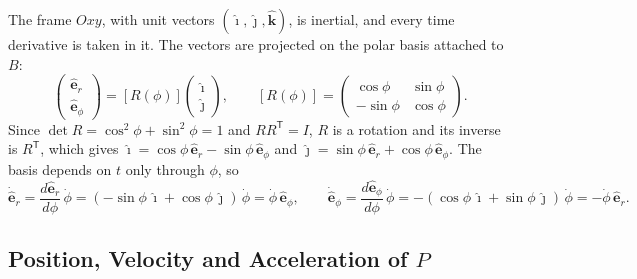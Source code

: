 \documentclass[11pt,a4paper]{article}
\numberwithin{equation}{section}
\newcommand{\er}{\hat{\mathbf{e}}_r}
\newcommand{\ephi}{\hat{\mathbf{e}}_\phi}
\newcommand{\ii}{\hat{\boldsymbol{\imath}}}
\newcommand{\jj}{\hat{\boldsymbol{\jmath}}}
\newcommand{\kk}{\hat{\mathbf{k}}}
\begin{document}
The frame $Oxy$, with unit vectors $(\ii,\jj,\kk)$, is inertial, and every time derivative is taken in it. The vectors are projected on the polar basis attached to $B$:
\begin{equation}
  \begin{pmatrix}\er\\ \ephi\end{pmatrix} = [R(\phi)]\begin{pmatrix}\ii\\ \jj\end{pmatrix},\qquad
  [R(\phi)] = \begin{pmatrix}\cos\phi & \sin\phi\\ -\sin\phi & \cos\phi\end{pmatrix}.
\end{equation}
Since $\det R=\cos^2\phi+\sin^2\phi=1$ and $RR^{\mathsf T}=I$, $R$ is a rotation and its inverse is $R^{\mathsf T}$, which gives $\ii=\cos\phi\,\er-\sin\phi\,\ephi$ and $\jj=\sin\phi\,\er+\cos\phi\,\ephi$. The basis depends on $t$ only through $\phi$, so
\begin{equation}
  \dot{\hat{\mathbf e}}_r = \frac{d\er}{d\phi}\,\dot\phi = (-\sin\phi\,\ii+\cos\phi\,\jj)\,\dot\phi = \dot\phi\,\ephi,\qquad
  \dot{\hat{\mathbf e}}_\phi = \frac{d\ephi}{d\phi}\,\dot\phi = -(\cos\phi\,\ii+\sin\phi\,\jj)\,\dot\phi = -\dot\phi\,\er. \label{eq:basisdot}
\end{equation}

\subsection{Position, Velocity and Acceleration of \texorpdfstring{$P$}{P}}
\end{document}
